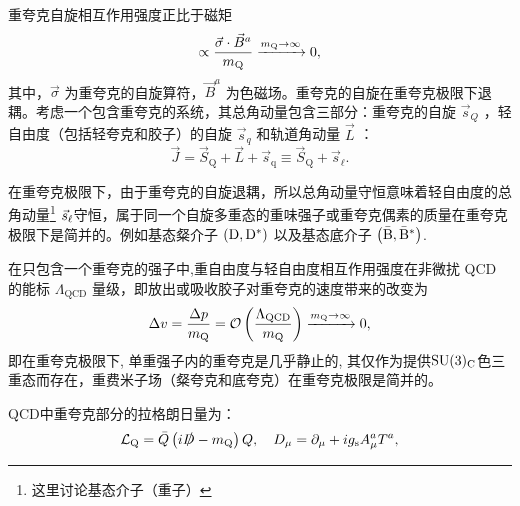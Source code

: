 重夸克自旋相互作用强度正比于磁矩$$
    \propto \frac{\vec{\sigma} \cdot \vec{B}^a}{m_{\mathrm{Q}}} \xrightarrow{m_{\mathrm{Q}} \rightarrow \infty} 0,$$
    其中，$\vec{\sigma}$ 为重夸克的自旋算符，$\vec{B}^a$ 为色磁场。重夸克的自旋在重夸克极限下退耦。考虑一个包含重夸克的系统，其总角动量包含三部分：重夸克的自旋 $\vec{s}_Q$ ，轻自由度（包括轻夸克和胶子）的自旋 $\vec{s}_q$ 和轨道角动量 $\vec{L}$ ：
$$
\vec{J} = \vec{S}_{\mathrm{Q}} + \vec{L} + \vec{s}_{\mathrm{q}} \equiv \vec{S}_{\mathrm{Q}} + \vec{s}_{\ell}.
$$

在重夸克极限下，由于重夸克的自旋退耦，所以总角动量守恒意味着轻自由度的总角动量\footnote{这里讨论基态介子（重子）} $\vec{s}_{\mathrm{\ell}}$守恒，属于同一个自旋多重态的重味强子或重夸克偶素的质量在重夸克极限下是简并的。例如基态粲介子 $\left(\mathrm{D}, \mathrm{D^*}\right)$ 以及基态底介子 $\left(\mathrm{\bar{B}},\mathrm{ \bar{B}^*}\right)$.

在只包含一个重夸克的强子中,重自由度与轻自由度相互作用强度在非微扰 QCD 的能标 $\Lambda_{\mathrm{QCD}}$ 量级，即放出或吸收胶子对重夸克的速度带来的改变为
$$
\Delta v=\frac{\Delta p}{m_{\mathrm{Q}}}=\mathcal{O}\left(\frac{\Lambda_{\mathrm{QCD}}}{m_{\mathrm{Q}}}\right) \xrightarrow{m_{\mathrm{Q}} \rightarrow \infty} 0,
$$
即在重夸克极限下, 单重强子内的重夸克是几乎静止的, 其仅作为提供$\mathrm{SU}(3)_{\mathrm{C}}$色三重态而存在，重费米子场（粲夸克和底夸克）在重夸克极限是简并的。

QCD中重夸克部分的拉格朗日量为：
\begin{equation}
    \mathcal{L}_{\mathrm{Q}} = \bar{Q}\left(i \slashed{D} - m_{\mathrm{Q}}\right) Q, \quad D_\mu = \partial_\mu + i g_{\mathrm{s}} A_\mu^a T^a,
    \label{eq:QCD_heavyquark_l}
\end{equation}

